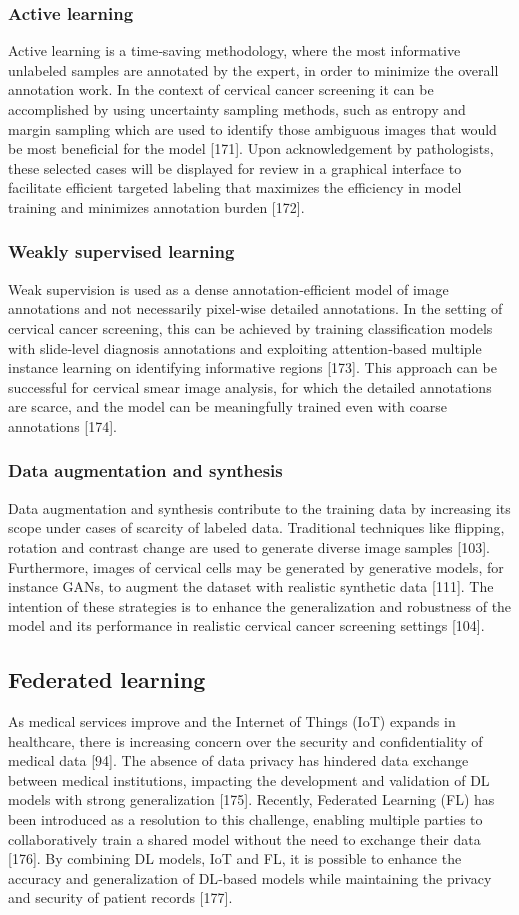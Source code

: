 \documentclass[final,5p,times,twocolumn,authoryear]{elsarticle}
\begin{document}
\subsubsection{Active learning}
Active learning is a time‑saving methodology, where the most informative unlabeled samples are annotated by the expert, in order to minimize the overall annotation work. In the context of cervical cancer screening it can be accomplished by using uncertainty sampling methods, such as entropy and margin sampling which are used to identify those ambiguous images that would be most beneficial for the model [171]. Upon acknowledgement by pathologists, these selected cases will be displayed for review in a graphical interface to facilitate efficient targeted labeling that maximizes the efficiency in model training and minimizes annotation burden [172].
\subsubsection{Weakly supervised learning}
Weak supervision is used as a dense annotation‑efficient model of image annotations and not necessarily pixel‑wise detailed annotations. In the setting of cervical cancer screening, this can be achieved by training classification models with slide‑level diagnosis annotations and exploiting attention‑based multiple instance learning on identifying informative regions [173]. This approach can be successful for cervical smear image analysis, for which the detailed annotations are scarce, and the model can be meaningfully trained even with coarse annotations [174].
\subsubsection{Data augmentation and synthesis}
Data augmentation and synthesis contribute to the training data by increasing its scope under cases of scarcity of labeled data. Traditional techniques like flipping, rotation and contrast change are used to generate diverse image samples [103]. Furthermore, images of cervical cells may be generated by generative models, for instance GANs, to augment the dataset with realistic synthetic data [111]. The intention of these strategies is to enhance the generalization and robustness of the model and its performance in realistic cervical cancer screening settings [104].
\subsection{Federated learning}
As medical services improve and the Internet of Things (IoT) expands in healthcare, there is increasing concern over the security and confidentiality of medical data [94]. The absence of data privacy has hindered data exchange between medical institutions, impacting the development and validation of DL models with strong generalization [175]. Recently, Federated Learning (FL) has been introduced as a resolution to this challenge, enabling multiple parties to collaboratively train a shared model without the need to exchange their data [176]. By combining DL models, IoT and FL, it is possible to enhance the accuracy and generalization of DL‑based models while maintaining the privacy and security of patient records [177].
\end{document}
